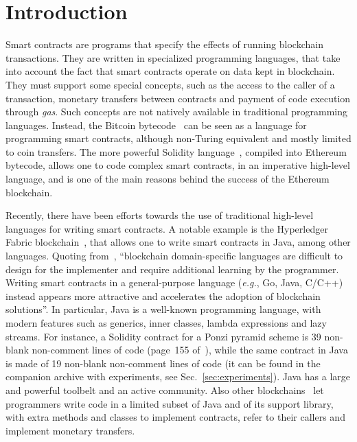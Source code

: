 \section{Introduction}\label{sec:introduction}

Smart contracts are programs that specify the effects of running blockchain transactions.
They are written in specialized programming languages, that take into account
the fact that smart contracts operate on data kept in blockchain. They must
support some special concepts, such as the access to the caller of a transaction,
monetary transfers between contracts
and payment of code execution through \emph{gas}.
Such concepts are not natively available
in traditional programming languages.
Instead, the Bitcoin bytecode~\cite{Antonopoulos17,Nakamoto08}
can be seen as a language for programming smart contracts,
although non-Turing equivalent and mostly limited to coin transfers. The more
powerful Solidity language~\cite{AntonopoulosW18},
compiled into Ethereum bytecode, allows one to code
complex smart contracts, in an imperative high-level language, and is
one of the main reasons behind the success of the Ethereum blockchain.

Recently, there have been efforts towards the use of traditional
high-level languages for writing smart contracts.
A notable example is the Hyperledger Fabric blockchain~\cite{AndroulakiBBCCC18,Vukolic17}, that allows one
to write smart contracts in Java, among other languages. Quoting from~\cite{AndroulakiBBCCC18},
``blockchain domain-specific languages are difficult to design for the implementer
and require additional learning by the programmer. Writing smart contracts
in a general-purpose language (\emph{e.g.}, Go, Java, C/C++) instead
appears more attractive and accelerates the adoption of blockchain solutions''.
In particular, Java is a well-known programming language,
with modern features such as generics, inner classes, lambda
expressions and lazy streams. For instance, a Solidity contract
for a Ponzi pyramid scheme is 39 non-blank non-comment lines of code
(page~155 of~\cite{IyerD18}), while the same contract in Java is made of 19 non-blank
non-comment lines of code (it can be found in the companion archive
with experiments, see Sec.~\ref{sec:experiments}).
Java has a large and powerful toolbelt and an active community.
Also other blockchains~\cite{aion,aion_example_contract,neo,neo_contract,Spoto19}
let programmers write code in a limited subset of Java
and of its support library,
with extra methods and classes to implement contracts, refer to their
callers and implement monetary transfers.

